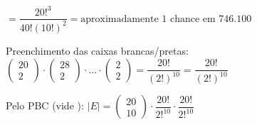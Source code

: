 \documentclass{article}
\begin{document}
	$ = \dfrac{20!^{3}}{40!(10!)^{2}} = \text{aproximadamente $1$ chance em $746.100$} $
	
	Preenchimento das caixas brancas/pretas: $ \begin{pmatrix}
	20  \\
	2
	\end{pmatrix} \cdot \begin{pmatrix}
	28  \\
	2
	\end{pmatrix} \cdot \dots \cdot \begin{pmatrix}
	2  \\
	2
	\end{pmatrix} = \dfrac{20!}{(2!)^{10}} = \dfrac{20!}{(2!)^{10}} $
	
	Pelo PBC (vide ): $ |E| = \begin{pmatrix}
	20  \\
	10
	\end{pmatrix} \cdot \dfrac{20!}{2!^{10}} \cdot \dfrac{20!}{2!^{10}} $
	
	
	
	
	
\end{document}
